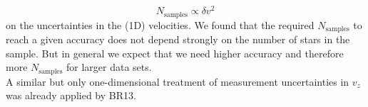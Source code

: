 \begin{equation*}
N_\text{samples} \propto \delta v^2
\end{equation*}
on the uncertainties in the (1D) velocities. We found that the required $N_\text{samples}$ to reach a given accuracy does not depend strongly on the number of stars in the sample. But in general we expect that we need higher accuracy and therefore more $N_\text{samples}$ for larger data sets.
\\A similar but only one-dimensional treatment of measurement uncertainties in $v_z$ was already applied by BR13.

